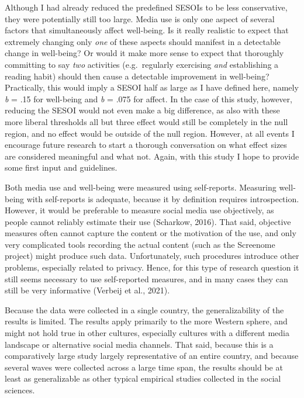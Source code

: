 \documentclass[
  man,mask]{apa7}
\begin{document}
Although I had already reduced the predefined SESOIs to be less conservative, they were potentially still too large.
Media use is only one aspect of several factors that simultaneously affect well-being.
Is it really realistic to expect that extremely changing only \emph{one} of these aspects should manifest in a detectable change in well-being?
Or would it make more sense to expect that thoroughly committing to say \emph{two} activities (e.g.~regularly exercising \emph{and} establishing a reading habit) should then cause a detectable improvement in well-being?
Practically, this would imply a SESOI half as large as I have defined here, namely \emph{b} = \textbar.15\textbar{} for well-being and \emph{b} = \textbar.075\textbar{} for affect.
In the case of this study, however, reducing the SESOI would not even make a big difference, as also with these more liberal thresholds all but three effect would still be completely in the null region, and no effect would be outside of the null region.
However, at all events I encourage future research to start a thorough conversation on what effect sizes are considered meaningful and what not.
Again, with this study I hope to provide some first input and guidelines.

Both media use and well-being were measured using self-reports.
Measuring well-being with self-reports is adequate, because it by definition requires introspection.
However, it would be preferable to measure social media use objectively, as people cannot reliably estimate their use (Scharkow, 2016).
That said, objective measures often cannot capture the content or the motivation of the use, and only very complicated tools recording the actual content (such as the Screenome project) might produce such data.
Unfortunately, such procedures introduce other problems, especially related to privacy.
Hence, for this type of research question it still seems necessary to use self-reported measures, and in many cases they can still be very informative (Verbeij et al., 2021).

Because the data were collected in a single country, the generalizability of the results is limited.
The results apply primarily to the more Western sphere, and might not hold true in other cultures, especially cultures with a different media landscape or alternative social media channels.
That said, because this is a comparatively large study largely representative of an entire country, and because several waves were collected across a large time span, the results should be at least as generalizable as other typical empirical studies collected in the social sciences.
\end{document}
